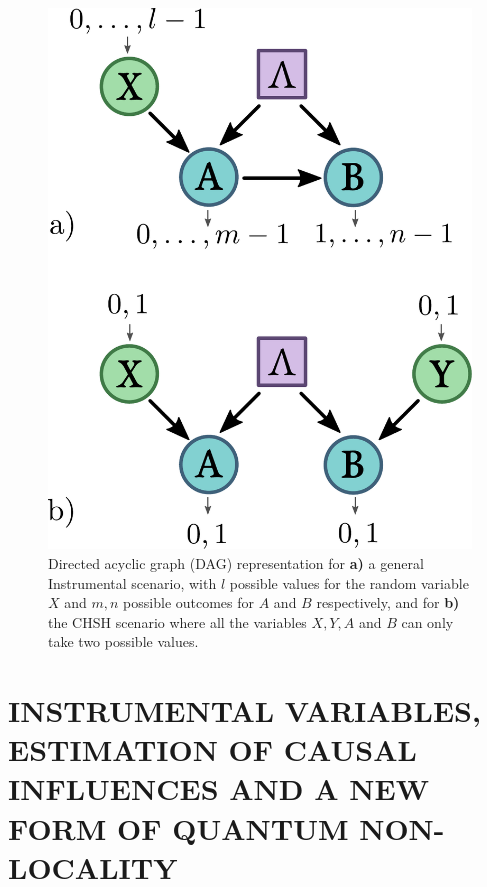 \documentclass[letterpaper]{article}
\begin{document}
\begin{figure}[t]
    \centering
    \includegraphics[width=.8\columnwidth]{images/chsh_inst_dag.pdf}
        \caption{
    Directed acyclic graph (DAG) representation for
    \textbf{a)} a general
    Instrumental scenario, with $l$ possible values for the random variable $X$
    and $m,n$ possible outcomes for $A$ and $B$ respectively, and for
    \textbf{b)} the CHSH scenario \cite{CHSH} where all the
    variables $X,Y,A$ and $B$ can only take two possible values.
}
    \label{fig:chshinstdag}

\end{figure} 

\section{INSTRUMENTAL VARIABLES, ESTIMATION OF CAUSAL INFLUENCES AND A NEW FORM OF QUANTUM NON-LOCALITY}
\end{document}
